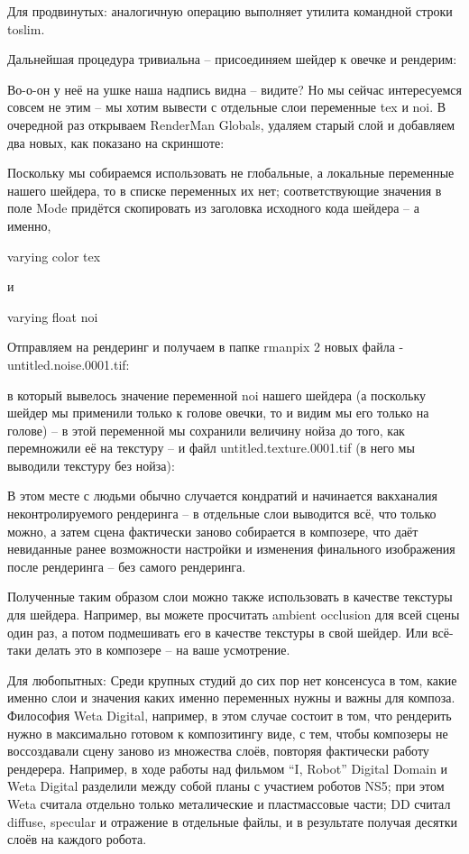  Для
    продвинутых: аналогичную операцию
    выполняет утилита командной строки toslim.
  

 Дальнейшая процедура тривиальна – присоединяем
    шейдер к овечке и рендерим:
  

  

 Во-о-он у неё на ушке наша надпись видна – видите?
    Но мы сейчас интересуемся совсем не этим – мы хотим вывести с
    отдельные слои переменные tex и noi. В очередной раз открываем
    RenderMan Globals, удаляем старый слой и добавляем два новых, как
    показано на скриншоте:
  

  

 Поскольку мы собираемся использовать не глобальные,
    а локальные переменные нашего шейдера, то в списке переменных их
    нет; соответствующие значения в поле Mode придётся скопировать из
    заголовка исходного кода шейдера – а именно,
  

varying
    color tex
  

 и
  

varying
    float noi
  

 Отправляем на рендеринг и получаем в папке rmanpix
    2 новых файла - untitled.noise.0001.tif:
  

  

 в который вывелось значение переменной noi нашего
    шейдера (а поскольку шейдер мы применили только к голове овечки, то
    и видим мы его только на голове) – в этой переменной мы сохранили
    величину нойза до того, как перемножили её на текстуру – и файл
    untitled.texture.0001.tif (в него мы выводили текстуру без
    нойза):
  

  

 В этом месте с людьми обычно случается кондратий и
    начинается вакханалия неконтролируемого рендеринга – в отдельные
    слои выводится всё, что только можно, а затем сцена фактически
    заново собирается в композере, что даёт невиданные ранее
    возможности настройки и изменения финального изображения после
    рендеринга – без самого рендеринга.
  

 Полученные таким образом слои можно также
    использовать в качестве текстуры для шейдера. Например, вы можете
    просчитать ambient occlusion для всей сцены один раз, а потом
    подмешивать его в качестве текстуры в свой шейдер. Или всё-таки
    делать это в композере – на ваше усмотрение.
  

 Для
    любопытных: Среди крупных студий
    до сих пор нет консенсуса в том, какие именно слои и значения каких
    именно переменных нужны и важны для композа. Философия Weta
    Digital, например, в этом случае состоит в том, что рендерить нужно
    в максимально готовом к композитингу виде, с тем, чтобы композеры
    не воссоздавали сцену заново из множества слоёв, повторяя
    фактически работу рендерера. Например, в ходе работы над фильмом
    “I, Robot” Digital Domain и Weta Digital разделили между собой
    планы с участием роботов NS5; при этом Weta считала отдельно только
    металические и пластмассовые части; DD считал diffuse, specular и
    отражение в отдельные файлы, и в результате получая десятки слоёв
    на каждого робота.
  

